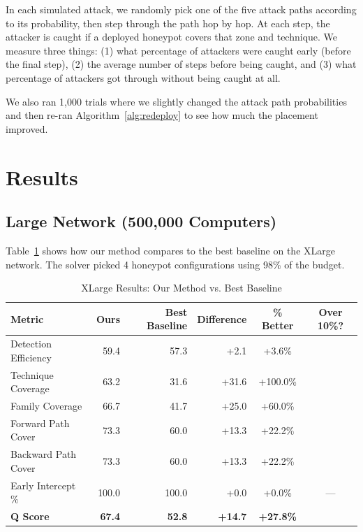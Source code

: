 \documentclass[journal]{IEEEtran}
\newcommand{\cmark}{\ding{51}}
\begin{document}
In each simulated attack, we randomly pick one of the five attack
paths according to its probability, then step through the path
hop by hop. At each step, the attacker is caught if a deployed
honeypot covers that zone and technique. We measure three things:
(1) what percentage of attackers were caught early (before the
final step), (2) the average number of steps before being caught,
and (3) what percentage of attackers got through without being
caught at all.

We also ran 1,000 trials where we slightly changed the attack
path probabilities and then re-ran Algorithm~\ref{alg:redeploy}
to see how much the placement improved.

\section{Results}
\label{sec:results}

\subsection{Large Network (500,000 Computers)}

Table~\ref{tab:xlarge} shows how our method compares to the best
baseline on the XLarge network. The solver picked 4 honeypot
configurations using 98\% of the budget.

\begin{table}[htbp]
\caption{XLarge Results: Our Method vs. Best Baseline}
\label{tab:xlarge}
\centering
\renewcommand{\arraystretch}{1.2}
\begin{tabular}{@{}lrrrcc@{}}
\toprule
\textbf{Metric} & \textbf{Ours} & \textbf{Best Baseline} &
\textbf{Difference} & \textbf{\% Better} & \textbf{Over 10\%?} \\
\midrule
Detection Efficiency & 59.4  & 57.3  & +2.1  & +3.6\%   & \cmark \\
Technique Coverage   & 63.2  & 31.6  & +31.6 & +100.0\% & \cmark \\
Family Coverage      & 66.7  & 41.7  & +25.0 & +60.0\%  & \cmark \\
Forward Path Cover   & 73.3  & 60.0  & +13.3 & +22.2\%  & \cmark \\
Backward Path Cover  & 73.3  & 60.0  & +13.3 & +22.2\%  & \cmark \\
Early Intercept \%   & 100.0 & 100.0 & +0.0  & +0.0\%   & ---    \\
\midrule
\textbf{Q Score}     & \textbf{67.4} & \textbf{52.8} &
  \textbf{+14.7} & \textbf{+27.8\%} & \cmark \\
\bottomrule
\end{tabular}
\end{table}
\end{document}
